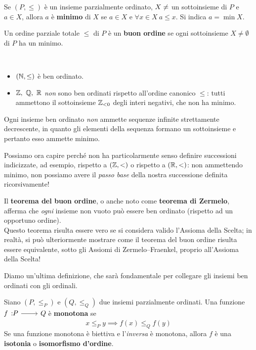 \begin{define}[Minimo]
	Se $\left(P,\leq\right)$ è un insieme parzialmente ordinato, $X\neq\empty$ un sottoinsieme di $P$ e $a\in X$, allora $a$ è \textbf{minimo} di $X$ se $a\in X$ e $\forall x\in X\ a\leq x$. Si indica $a=\min X$.
\end{define}
\begin{define}
	Un ordine parziale totale $\leq$ di $P$ è un \textbf{buon ordine} se ogni sottoinsieme $X\neq \emptyset$ di $P$ ha un minimo.
\end{define}
\begin{examples}~{}
	\begin{itemize}
		\item $\left(\mathbb{N},\leq\right)$ è ben ordinato.
		\item $\integerset,\ \rationalset,\ \realset$ \textit{non} sono ben ordinati rispetto all'ordine canonico $\leq$: tutti ammettono il sottoinsieme $\mathbb{Z}_{<0}$ degli interi negativi, che non ha minimo.
	\end{itemize}
\end{examples}
\begin{observe}
	Ogni insieme ben ordinato \textit{non} ammette sequenze infinite strettamente decrescente, in quanto gli elementi della sequenza formano un sottoinsieme e pertanto esso ammette minimo.
\end{observe}
\begin{intuit}
	Possiamo ora capire perché non ha particolarmente senso definire successioni indicizzate, ad esempio, rispetto a $\left(\mathbb{Z},<\right)$ o rispetto a $\left(\mathbb{R},<\right)$: non ammettendo minimo, non possiamo avere il \textit{passo base} della nostra successione definita ricorsivamente!
\end{intuit}
\begin{digression}
	Il \textbf{teorema del buon ordine}, o anche noto come \textbf{teorema di Zermelo}, afferma che \textit{ogni} insieme non vuoto può essere ben ordinato (rispetto ad un opportuno ordine).\\
	Questo teorema risulta essere vero se si considera valido l'Assioma della Scelta; in realtà, si può ulteriormente mostrare come il teorema del buon ordine risulta essere equivalente, sotto gli Assiomi di Zermelo–Fraenkel, proprio all'Assioma della Scelta!
\end{digression}
Diamo un'ultima definizione, che sarà fondamentale per collegare gli insiemi ben ordinati con gli ordinali.
\begin{define}
	Siano $\left(P,\leq_P\right)$ e $\left(Q,\leq_Q\right)$ due insiemi parzialmente ordinati. Una funzione $\funz{f}{P}{Q}$ è \textbf{monotona} se
	\begin{equation}
		x\leq_P y\implies f(x)\leq_Q f(y)
	\end{equation}
Se una funzione monotona è biettiva e l'\textit{inversa} è monotona, allora $f$ è una \textbf{isotonia} o \textbf{isomorfismo d'ordine}.
\end{define}

